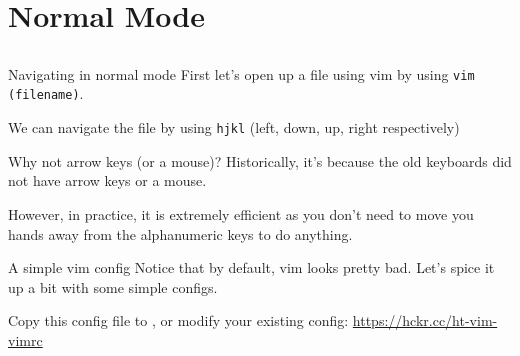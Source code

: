 \documentclass[12pt]{beamer}
\begin{document}
\section{Normal Mode}
\subsection{}

\begin{frame}{Navigating in normal mode}
    First let's open up a file using vim by using \texttt{vim (filename)}.

    We can navigate the file by using \texttt{hjkl} (left, down, up, right respectively)

    Why not arrow keys (or a mouse)? Historically, it's because the old keyboards did not have arrow keys or a mouse.

    However, in practice, it is extremely efficient as you don't need to move you hands away from the alphanumeric
    keys to do anything.
\end{frame}{}

\begin{frame}{A simple vim config}
    Notice that by default, vim looks pretty bad. Let's spice it up a bit with some simple configs.

    Copy this config file to , or modify your existing config: \url{https://hckr.cc/ht-vim-vimrc}
\end{frame}{}
\end{document}
